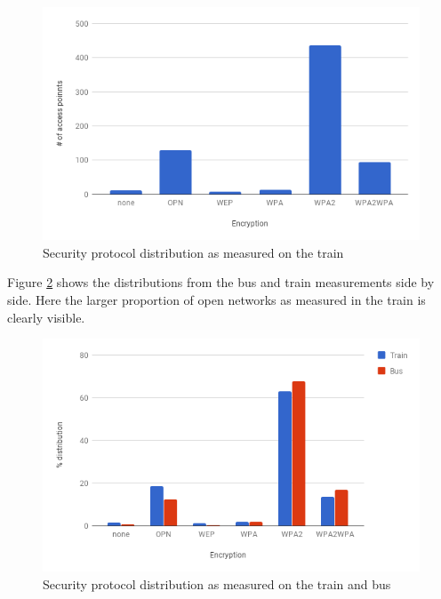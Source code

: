 \documentclass[letterpaper, 10 pt, conference]{ieeeconf}  %
\begin{document}
\begin{figure}[h]
\includegraphics[scale=0.4]{Figures/TrainEncryptionCount.png}
\caption{Security protocol distribution as measured on the train}
\label{fig:trainencdist}
\end{figure}

Figure \ref{fig:encdist} shows the distributions from the bus and train measurements side by side. Here the larger proportion of open networks as measured in the train is clearly visible.

\begin{figure}[h]
\includegraphics[scale=0.4]{Figures/EncryptionDist.png}
\caption{Security protocol distribution as measured on the train and bus}
\label{fig:encdist}
\end{figure}
\end{document}
